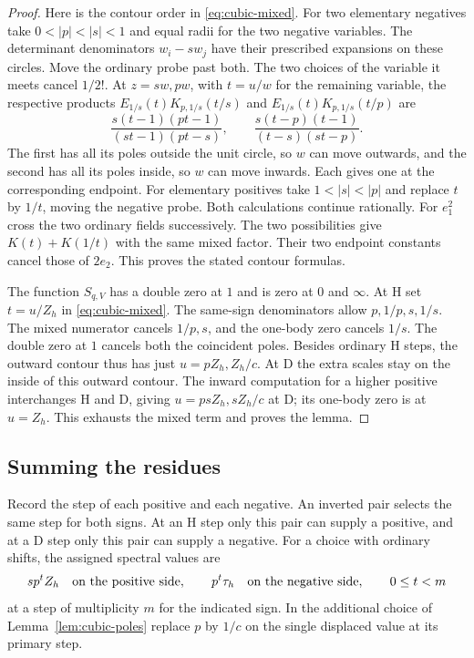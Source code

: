 \begin{proof}
Here is the contour order in \eqref{eq:cubic-mixed}. For two elementary
negatives take $0<|p|<|s|<1$ and equal radii for the two negative
variables. The determinant denominators $w_i-sw_j$ have their
prescribed expansions on these circles. Move the ordinary probe past
both. The two choices of the variable it meets cancel $1/2!$. At
$z=sw,pw$, with $t=u/w$ for the remaining variable, the respective
products $E_{1/s}(t)K_{p,1/s}(t/s)$ and $E_{1/s}(t)K_{p,1/s}(t/p)$
are
\[
 \frac{s(t-1)(pt-1)}{(st-1)(pt-s)},\qquad
 \frac{s(t-p)(t-1)}{(t-s)(st-p)} .
\]
The first has all its poles outside the unit circle, so $w$ can move
outwards, and the second has all its poles inside, so $w$ can move
inwards. Each gives one at the corresponding endpoint. For elementary
positives take $1<|s|<|p|$ and replace $t$ by $1/t$, moving the negative
probe. Both calculations continue rationally. For $e_1^2$ cross the
two ordinary fields successively. The two possibilities give
$K(t)+K(1/t)$ with the same mixed factor. Their two endpoint constants
cancel those of $2e_2$. This proves the stated contour formulas.

The function $S_{q,V}$ has a double zero at $1$ and is zero at $0$ and
$\infty$. At H set $t=u/Z_h$ in \eqref{eq:cubic-mixed}. The same-sign
denominators allow $p,1/p,s,1/s$. The mixed numerator cancels $1/p,s$,
and the one-body zero cancels $1/s$. The double zero at $1$ cancels
both the coincident poles. Besides ordinary H steps, the outward
contour thus has just $u=pZ_h,Z_h/c$. At D the extra scales stay on
the inside of this outward contour. The inward computation for a
higher positive interchanges H and D, giving $u=psZ_h,sZ_h/c$ at D;
its one-body zero is at $u=Z_h$. This exhausts the mixed term and
proves the lemma.
\end{proof}

\subsection{Summing the residues}
Record the step of each positive and each negative. An inverted pair
selects the same step for both signs. At an H step only this pair can
supply a positive, and at a D step only this pair can supply a negative.
For a choice with ordinary shifts, the assigned spectral values are
\[
  s p^t Z_h\quad\hbox{on the positive side},\qquad
  p^t \tau_h\quad\hbox{on the negative side},\qquad 0\le t<m
\]
at a step of multiplicity $m$ for the indicated sign. In the additional
choice of Lemma~\ref{lem:cubic-poles} replace $p$ by $1/c$ on the
single displaced value at its primary step.

